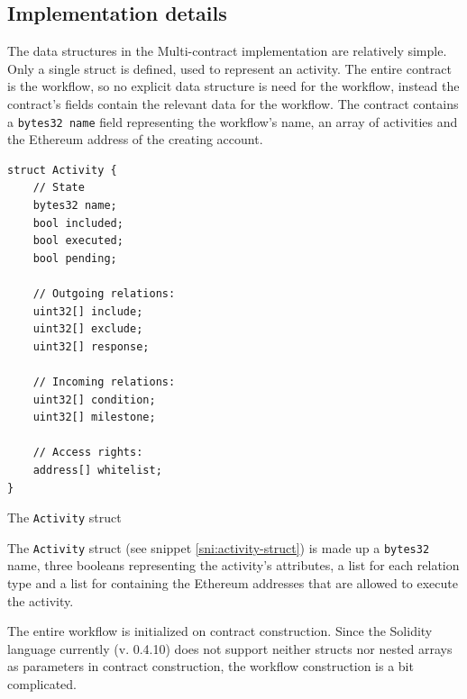 \documentclass{article}
\begin{document}

		\subsection{Implementation details}
		The data structures in the Multi-contract implementation are relatively simple.
		Only a single struct is defined, used to represent an activity.
		The entire contract is the workflow, so no explicit data structure is need for the workflow, instead the contract's fields contain the relevant data for the workflow.
		The contract contains a \texttt{bytes32 name} field representing the workflow's name, an array of activities and the Ethereum address of the creating account.
		\begin{snippet}[!ht]
			\centering
			\begin{lstlisting}[language=solidity, numbers=none]
struct Activity {
    // State
    bytes32 name;
    bool included;
    bool executed;
    bool pending;

    // Outgoing relations:
    uint32[] include;
    uint32[] exclude;
    uint32[] response;
    
    // Incoming relations:
    uint32[] condition;
    uint32[] milestone;

    // Access rights:
    address[] whitelist;
}				
			\end{lstlisting}
		 	\caption[The \texttt{Activity} struct]
		 	{The \texttt{Activity} struct}
		 	\label{sni:activity-struct}
		\end{snippet}
		The \texttt{Activity} struct (see snippet \ref{sni:activity-struct}) is made up a \texttt{bytes32} name, three booleans representing the activity's attributes, a list for each relation type and a list for containing the Ethereum addresses that are allowed to execute the activity.

		The entire workflow is initialized on contract construction. 
		Since the Solidity language currently (v. 0.4.10) does not support neither structs nor nested arrays as parameters in contract construction, the workflow construction is a bit complicated. 
\end{document}
